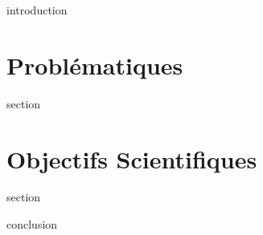 \chaptertoc{}

\label{sec:2-int}
{introduction}

\section{Problématiques}
\label{sec:2-1}
{section}

\section{Objectifs Scientifiques}
\label{sec:2-2}
{section}


\label{sec:2-cnc}
{conclusion}


